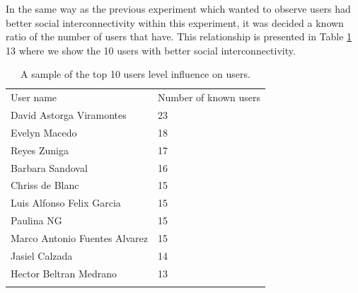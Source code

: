 In the same way as the previous experiment which wanted to observe users had
better social interconnectivity within this experiment, it was decided a known
ratio of the number of users that have. This relationship is presented in Table
\ref{tab:knownUsers_3} 13 where we show the 10 users with better social
interconnectivity.

\begin{table}
\small
\caption{A sample of the top 10 users level influence on users.}
\label{tab:knownUsers_3}
\centering
\small
\begin{tabular}{p{3cm} p{3cm}  }
\hline\noalign{\smallskip}
 User name & Number of known users \\
\noalign{\smallskip}\hline\noalign{\smallskip}
\small{David Astorga Viramontes} & \small{23}  \\ \hline
\small{Evelyn Macedo} & \small{18}  \\ \hline
\small{Reyes Zuniga} & \small{17}  \\ \hline
\small{Barbara Sandoval} & \small{16}  \\ \hline
\small{Chriss de Blanc} & \small{15}  \\ \hline
\small{Luis Alfonso Felix Garcia} & \small{15}  \\ \hline
\small{Paulina NG} & \small{15}  \\ \hline
\small{Marco Antonio Fuentes Alvarez} & \small{15}  \\ \hline
\small{Jasiel Calzada} & \small{14}  \\ \hline
\small{Hector Beltran Medrano} & \small{13}  \\ \hline
\noalign{\smallskip}\hline
\end{tabular}
\end{table}


